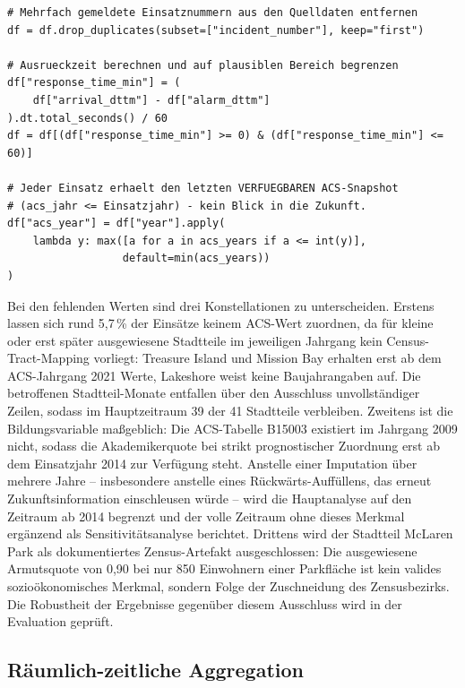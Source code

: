 \begin{lstlisting}[caption={Deduplikation, Plausibilitätsfilter und strikt
prognostischer ACS-Join (Ausschnitte aus \texttt{pipeline/02\_join.py})},
label=lst:bereinigung]
# Mehrfach gemeldete Einsatznummern aus den Quelldaten entfernen
df = df.drop_duplicates(subset=["incident_number"], keep="first")

# Ausrueckzeit berechnen und auf plausiblen Bereich begrenzen
df["response_time_min"] = (
    df["arrival_dttm"] - df["alarm_dttm"]
).dt.total_seconds() / 60
df = df[(df["response_time_min"] >= 0) & (df["response_time_min"] <= 60)]

# Jeder Einsatz erhaelt den letzten VERFUEGBAREN ACS-Snapshot
# (acs_jahr <= Einsatzjahr) - kein Blick in die Zukunft.
df["acs_year"] = df["year"].apply(
    lambda y: max([a for a in acs_years if a <= int(y)],
                  default=min(acs_years))
)
\end{lstlisting}

Bei den fehlenden Werten sind drei Konstellationen zu unterscheiden.
Erstens lassen sich rund 5,7\,\% der Einsätze keinem ACS-Wert zuordnen, da
für kleine oder erst später ausgewiesene Stadtteile im jeweiligen Jahrgang
kein Census-Tract-Mapping vorliegt: Treasure Island und Mission Bay erhalten
erst ab dem ACS-Jahrgang 2021 Werte, Lakeshore weist keine Baujahrangaben
auf. Die betroffenen Stadtteil-Monate entfallen über den Ausschluss
unvollständiger Zeilen, sodass im Hauptzeitraum 39 der 41 Stadtteile
verbleiben. Zweitens ist die Bildungsvariable maßgeblich: Die ACS-Tabelle
B15003 existiert im Jahrgang 2009 nicht, sodass die Akademikerquote bei
strikt prognostischer Zuordnung erst ab dem Einsatzjahr 2014 zur Verfügung
steht. Anstelle einer Imputation über mehrere Jahre -- insbesondere
anstelle eines Rückwärts-Auffüllens, das erneut Zukunftsinformation
einschleusen würde -- wird die Hauptanalyse auf den Zeitraum ab 2014
begrenzt und der volle Zeitraum ohne dieses Merkmal ergänzend als
Sensitivitätsanalyse berichtet. Drittens wird der Stadtteil McLaren Park als
dokumentiertes Zensus-Artefakt ausgeschlossen: Die ausgewiesene Armutsquote
von 0,90 bei nur 850 Einwohnern einer Parkfläche ist kein valides
sozioökonomisches Merkmal, sondern Folge der Zuschneidung des Zensusbezirks.
Die Robustheit der Ergebnisse gegenüber diesem Ausschluss wird in der
Evaluation geprüft.

\subsection{Räumlich-zeitliche Aggregation}
\label{sec:aggregation}

